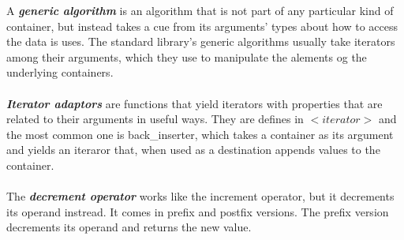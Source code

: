 \documentclass[12pt, a4papper]{article}
\begin{document}
A \textbf{\textit{generic algorithm}} is an algorithm that is not part of any particular kind of container, but instead takes a cue from its arguments' types about how to access the data is uses. The standard library's generic algorithms usually take iterators among their arguments, which they use to manipulate the alements og the underlying containers.\\
\\
\textbf{\textit{Iterator adaptors}} are functions that yield iterators with properties that are related to their arguments in useful ways. They are defines in $<iterator>$ and the most common one is back\_inserter, which takes a container as its argument and yields an iteraror that, when used as a destination appends values to the container. \\
\\
The \textbf{\textit{decrement operator}} works like the increment operator, but it decrements its operand instread. It comes in prefix and postfix versions. The prefix version decrements its operand and returns the new value.
\end{document}
